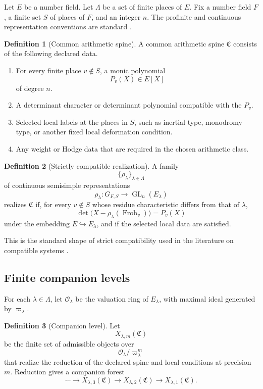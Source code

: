 \documentclass{aomart}
\theoremstyle{definition}
\newtheorem{definition}[definition]{Definition}
\theoremstyle{remark}
\newcommand{\OO}{\mathcal O}
\newcommand{\Frob}{\operatorname{Frob}}
\newcommand{\GL}{\operatorname{GL}}
\newcommand{\mathfrakC}{\mathfrak C}
\begin{document}
Let \(E\) be a number field. Let \(\Lambda\) be a set of finite places of \(E\). Fix a number field \(F\), a finite set \(S\) of places of \(F\), and an integer \(n\). The profinite and continuous representation conventions are standard \cite{RibesZalesskii2010}.

\begin{definition}[Common arithmetic spine]\label{def:common_spine}
A common arithmetic spine \(\mathfrakC\) consists of the following declared data.
\begin{enumerate}
\item For every finite place \(v\notin S\), a monic polynomial
\[
P_v(X)\in E[X]
\]
of degree \(n\).
\item A determinant character or determinant polynomial compatible with the \(P_v\).
\item Selected local labels at the places in \(S\), such as inertial type, monodromy type, or another fixed local deformation condition.
\item Any weight or Hodge data that are required in the chosen arithmetic class.
\end{enumerate}
\end{definition}

\begin{definition}[Strictly compatible realization]\label{def:strict_compatible_realization}
A family
\[
\{\rho_\lambda\}_{\lambda\in\Lambda}
\]
of continuous semisimple representations
\[
\rho_\lambda:G_{F,S}\longrightarrow\GL_n(E_\lambda)
\]
realizes \(\mathfrakC\) if, for every \(v\notin S\) whose residue characteristic differs from that of \(\lambda\),
\[
\det\bigl(X-\rho_\lambda(\Frob_v)\bigr)
=
P_v(X)
\]
under the embedding \(E\hookrightarrow E_\lambda\), and if the selected local data are satisfied.
\end{definition}

This is the standard shape of strict compatibility used in the literature on compatible systems \cite{Serre1998,LarsenPink1992,BellaicheChenevier2009}.

\subsection{Finite companion levels}

For each \(\lambda\in\Lambda\), let \(\OO_\lambda\) be the valuation ring of \(E_\lambda\), with maximal ideal generated by \(\varpi_\lambda\).

\begin{definition}[Companion level]\label{def:companion_level}
Let
\[
X_{\lambda,m}(\mathfrakC)
\]
be the finite set of admissible objects over
\[
\OO_\lambda/\varpi_\lambda^m
\]
that realize the reduction of the declared spine and local conditions at precision \(m\). Reduction gives a companion forest
\[
\cdots\longrightarrow X_{\lambda,3}(\mathfrakC)
\longrightarrow X_{\lambda,2}(\mathfrakC)
\longrightarrow X_{\lambda,1}(\mathfrakC).
\]
\end{definition}
\end{document}
